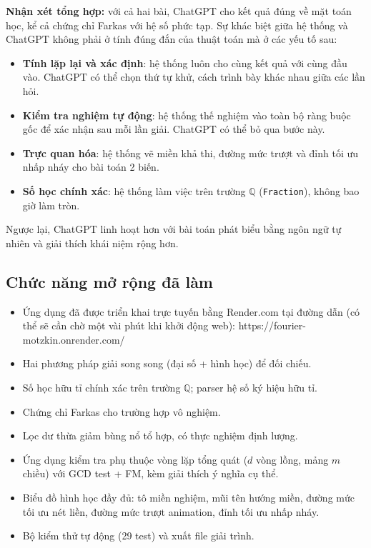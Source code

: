 \documentclass[12pt,a4paper]{article}
\theoremstyle{definition}
\newcommand{\Q}{\mathbb{Q}}
\begin{document}
\textbf{Nhận xét tổng hợp:} với cả hai bài, ChatGPT cho kết quả đúng về mặt
toán học, kể cả chứng chỉ Farkas với hệ số phức tạp. Sự khác biệt giữa hệ
thống và ChatGPT không phải ở tính đúng đắn của thuật toán mà ở các yếu tố
sau:

\begin{itemize}
    \item \textbf{Tính lặp lại và xác định}: hệ thống luôn cho cùng kết quả với
          cùng đầu vào. ChatGPT có thể chọn thứ tự khử, cách trình bày khác
          nhau giữa các lần hỏi.
    \item \textbf{Kiểm tra nghiệm tự động}: hệ thống thế nghiệm vào toàn bộ
          ràng buộc gốc để xác nhận sau mỗi lần giải. ChatGPT có thể bỏ qua
          bước này.
    \item \textbf{Trực quan hóa}: hệ thống vẽ miền khả thi, đường mức trượt
          và đỉnh tối ưu nhấp nháy cho bài toán 2 biến.
    \item \textbf{Số học chính xác}: hệ thống làm việc trên trường $\Q$
          (\texttt{Fraction}), không bao giờ làm tròn. 
\end{itemize}

Ngược lại, ChatGPT linh hoạt hơn với bài toán phát biểu bằng ngôn ngữ tự nhiên
và giải thích khái niệm rộng hơn.

\subsection{Chức năng mở rộng đã làm}

\begin{itemize}
    \item Ứng dụng đã được triển khai trực tuyến bằng Render.com tại đường dẫn (có thể sẽ cần chờ một vài phút khi khởi động web): https://fourier-motzkin.onrender.com/
    \item Hai phương pháp giải song song (đại số + hình học) để đối chiếu.
    \item Số học hữu tỉ chính xác trên trường $\Q$; parser hệ số ký hiệu hữu tỉ.
    \item Chứng chỉ Farkas cho trường hợp vô nghiệm.
    \item Lọc dư thừa giảm bùng nổ tổ hợp, có thực nghiệm định lượng.
    \item Ứng dụng kiểm tra phụ thuộc vòng lặp tổng quát ($d$ vòng lồng, mảng
          $m$ chiều) với GCD test + FM, kèm giải thích ý nghĩa cụ thể.
    \item Biểu đồ hình học đầy đủ: tô miền nghiệm, mũi tên hướng miền, đường
          mức tối ưu nét liền, đường mức trượt animation, đỉnh tối ưu nhấp nháy.
    \item Bộ kiểm thử tự động (29 test) và xuất file giải trình.
\end{itemize}
\end{document}
